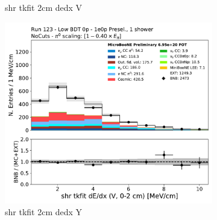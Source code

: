 \begin{figure}[H]
\begin{subfigure}{0.3\textwidth}
    \caption{shr tkfit 2cm dedx V}
    \end{subfigure}
    \begin{subfigure}{0.3\textwidth}
    \includegraphics[width=1.0\textwidth]{1e0p/Low_BDT_Sideband/shr_tkfit_2cm_dedx_V.pdf}
    \caption{shr tkfit 2cm dedx Y}
    \end{subfigure}
    \caption{} 
    \label{fig:HE_1eNp_1}
\end{figure}

